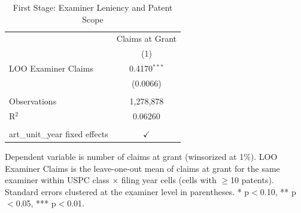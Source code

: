 
\begin{table}[htbp]
   \caption{\label{tab:first_stage} First Stage: Examiner Leniency and Patent Scope}
   \bigskip
   \centering
   \begin{tabular}{lc}
      \toprule
                                      & Claims at Grant\\  
                                      & (1)\\  
      \midrule 
      LOO Examiner Claims             & 0.4170$^{***}$\\   
                                      & (0.0066)\\   
       \\
      Observations                    & 1,278,878\\  
      R$^2$                           & 0.06260\\  
       \\
      art\_unit\_year fixed effects   & $\checkmark$\\   
      \bottomrule
   \end{tabular}
   
   \par \raggedright 
   Dependent variable is number of claims at grant (winsorized at 1\%). LOO Examiner Claims is the leave-one-out mean of claims at grant for the same examiner within USPC class $\times$ filing year cells (cells with $\geq$10 patents). Standard errors clustered at the examiner level in parentheses. * p$<$0.10, ** p$<$0.05, *** p$<$0.01.
\end{table}


